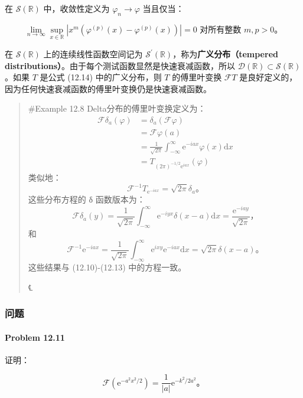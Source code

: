 在 \(\mathcal{S}\left( \mathbb{R} \right)\) 中，收敛性定义为
\(\varphi_{n} \rightarrow \varphi\) 当且仅当：

\[\lim\limits_{n \rightarrow \infty}\sup\limits_{x \in \mathbb{R}}\left| x^{m}\left( \varphi^{(p)}(x) - \varphi^{(p)}(x) \right) \right| = 0\mathrm{\text{ 对所有整数 }}m,p > 0。\]

在 \(\mathcal{S}\left( \mathbb{R} \right)\) 上的连续线性函数空间记为
\(\mathcal{S}^{\prime}\left( \mathbb{R} \right)\)，称为\textbf{广义分布（tempered
distributions）}。由于每个测试函数显然是快速衰减函数，所以
\(\mathcal{D}\left( \mathbb{R} \right) \subset \mathcal{S}\left( \mathbb{R} \right)\)。如果
\(T\) 是公式 (12.14) 中的广义分布，则 \(T\) 的傅里叶变换
\(\mathcal{F}T\)
是良好定义的，因为任何快速衰减函数的傅里叶变换仍是快速衰减函数。

\begin{quote}
\#Example 12.8 Delta分布的傅里叶变换定义为： \[\begin{aligned}
\mathcal{F}\delta_{a}(\varphi) & = \delta_{a}\left( \mathcal{F}\varphi \right) \\
 & = \mathcal{F}\varphi(a) \\
 & = \frac{1}{\sqrt{2\pi}}\int_{- \infty}^{\infty}\mathrm{e}^{- iax}\varphi(x)\mathrm{d}x \\
 & = T_{(2\pi)^{- 1/2}\mathrm{e}^{iax}}(\varphi)
\end{aligned}\] 类似地：
\[\mathcal{F}^{- 1}T_{\mathrm{e}^{- iax}} = \sqrt{2\pi}\delta_{a}。\]
这些分布方程的 δ 函数版本为：
\[\mathcal{F}\delta_{a}(y) = \frac{1}{\sqrt{2\pi}}\int_{- \infty}^{\infty}\mathrm{e}^{- iyx}\delta(x - a)\mathrm{d}x = \frac{\mathrm{e}^{- iay}}{\sqrt{2\pi}}，\]
和
\[\mathcal{F}^{- 1}\mathrm{e}^{- iax} = \frac{1}{\sqrt{2\pi}}\int_{- \infty}^{\infty}\mathrm{e}^{ixy}\mathrm{e}^{- iax}\mathrm{d}x = \sqrt{2\pi}\delta(x - a)。\]
这些结果与 (12.10)-(12.13) 中的方程一致。

℄~
\end{quote}

\subsubsection{问题}\label{ux95eeux9898-2}

\paragraph{Problem 12.11}\label{problem-12.11}

证明：

\[\mathcal{F}\left( \mathrm{e}^{- a^{2}x^{2}/2} \right) = \frac{1}{|a|}\mathrm{e}^{- k^{2}/2a^{2}}。\]

